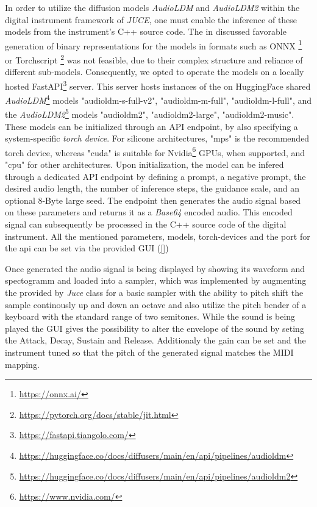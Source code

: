 \documentclass{nime-alternate} %
\begin{document}
In order to utilize the diffusion models \emph{AudioLDM} and \emph{AudioLDM2} within the digital instrument framework of \emph{JUCE}, one must enable the inference of these models from the instrument's C++ source code. The in \cite{oli_larkin_machine_2023} discussed favorable generation of binary representations for the models in formats such as ONNX \footnote{\url{https://onnx.ai/}} or Torchscript \footnote{\url{https://pytorch.org/docs/stable/jit.html}} was not feasible, due to their complex structure and reliance of different sub-models. Consequently, we opted to operate the models on a locally hosted FastAPI\footnote{\url{https://fastapi.tiangolo.com/}} server. This server hosts instances of the on HuggingFace shared \emph{AudioLDM}\footnote{\url{https://huggingface.co/docs/diffusers/main/en/api/pipelines/audioldm}} models "audioldm-s-full-v2", "audioldm-m-full", "audioldm-l-full", and the \emph{AudioLDM2}\footnote{\url{https://huggingface.co/docs/diffusers/main/en/api/pipelines/audioldm2}} models "audioldm2", "audioldm2-large", "audioldm2-music". These models can be initialized through an API endpoint, by also specifying a system-specific \emph{torch device}. For silicone architectures, "mps" is the recommended torch device, whereas "cuda" is suitable for Nvidia\footnote{\url{https://www.nvidia.com/}} GPUs, when supported, and "cpu" for other architectures. Upon initialization, the model can be infered through a dedicated API endpoint by defining a prompt, a negative prompt, the desired audio length, the number of inference steps, the guidance scale, and an optional 8-Byte large seed. The endpoint then generates the audio signal based on these parameters and returns it as a \emph{Base64} encoded audio. This encoded signal can subsequently be processed in the C++ source code of the digital instrument. All the mentioned parameters, models, torch-devices and the port for the api can be set via the provided GUI (\ref{})
\newline

Once generated the audio signal is being displayed by showing its waveform and spectogramm and loaded into a sampler, which was implemented by augmenting the provided by \emph{Juce} class for a basic sampler with the ability to pitch shift the sample continously up and down an octave and also utilize the pitch bender of a keyboard with the standard range of two semitones. While the sound is being played the GUI gives the possibility to alter the envelope of the sound by seting the Attack, Decay, Sustain and Release. Additionaly the gain can be set and the instrument tuned so that the pitch of the generated signal matches the MIDI mapping. 
\end{document}
